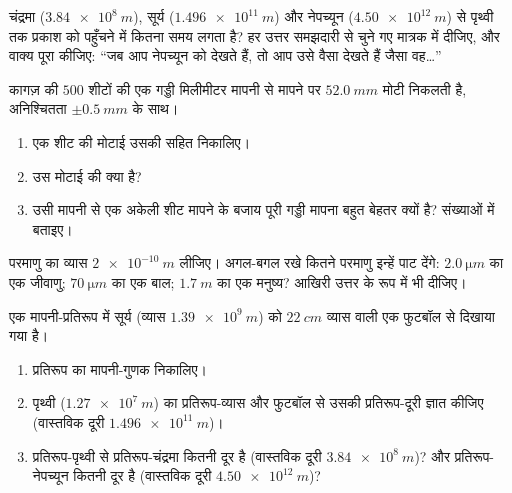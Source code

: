 \begin{exercise}[$\star\star$]\label{exo:g10:orders-of-magnitude:7}
चंद्रमा ($\qty{3.84e8}{m}$), सूर्य ($\qty{1.496e11}{m}$) और नेपच्यून ($\qty{4.50e12}{m}$) से पृथ्वी तक
प्रकाश को पहुँचने में कितना समय लगता है? हर उत्तर समझदारी से चुने गए
मात्रक में दीजिए, और वाक्य पूरा कीजिए: ``जब आप नेपच्यून को
देखते हैं, तो आप उसे वैसा देखते हैं जैसा वह\dots''
\end{exercise}

\begin{exercise}[$\star\star$]\label{exo:g10:orders-of-magnitude:8}
कागज़ की $500$ शीटों की एक गड्डी मिलीमीटर मापनी से मापने पर $\qty{52.0}{mm}$
मोटी निकलती है, अनिश्चितता $\pm\qty{0.5}{mm}$ के साथ।
\begin{enumerate}
  \item एक शीट की मोटाई उसकी  सहित निकालिए।
  \item उस मोटाई की  क्या है?
  \item उसी मापनी से एक अकेली शीट मापने के बजाय पूरी गड्डी मापना बहुत
        बेहतर क्यों है? संख्याओं में बताइए।
\end{enumerate}
\end{exercise}

\begin{exercise}[$\star\star$]\label{exo:g10:orders-of-magnitude:9}
परमाणु का व्यास $\qty{2e-10}{m}$ लीजिए। अगल-बगल रखे कितने परमाणु इन्हें पाट
देंगे: $\qty{2.0}{\micro m}$ का एक जीवाणु; $\qty{70}{\micro m}$ का एक बाल; $\qty{1.7}{m}$ का एक मनुष्य?
आखिरी उत्तर  के रूप में भी दीजिए।
\end{exercise}

\begin{exercise}[$\star\star$]\label{exo:g10:orders-of-magnitude:10}
एक मापनी-प्रतिरूप में सूर्य (व्यास $\qty{1.39e9}{m}$) को $\qty{22}{cm}$ व्यास वाली एक
फुटबॉल से दिखाया गया है।
\begin{enumerate}
  \item प्रतिरूप का मापनी-गुणक निकालिए।
  \item पृथ्वी ($\qty{1.27e7}{m}$) का प्रतिरूप-व्यास और फुटबॉल से उसकी
        प्रतिरूप-दूरी ज्ञात कीजिए (वास्तविक दूरी $\qty{1.496e11}{m}$)।
  \item प्रतिरूप-पृथ्वी से प्रतिरूप-चंद्रमा कितनी दूर है (वास्तविक दूरी
        $\qty{3.84e8}{m}$)? और प्रतिरूप-नेपच्यून कितनी दूर है (वास्तविक दूरी
        $\qty{4.50e12}{m}$)?
\end{enumerate}
\end{exercise}

